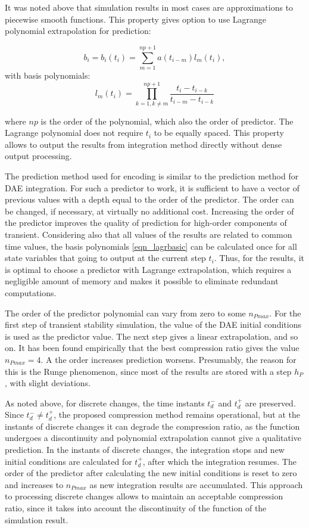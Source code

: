 \documentclass[lettersize,journal]{IEEEtran}
\begin{document}
It was noted above that simulation results  in most cases are approximations to piecewise smooth functions.
This property gives option to use Lagrange polynomial extrapolation for prediction:

\begin{equation}
	\label{eqn_lagrb}
	b_i=b_i(t_i)=\sum_{m=1}^{np+1} a(t_{i-m})l_m(t_i),
\end{equation}
\noindent with basis polynomials:
\begin{equation}
	\label{eqn_lagrbasic}
	l_m(t_i)=\prod_{k=1, k \neq m}^{np+1} \frac{t_i-t_{i-k}}{t_{i-m}-t_{i-k}}
\end{equation}

\noindent where \(np\) is the order of the polynomial, which also the order of predictor. 
The Lagrange polynomial does not require \(t_i\) to be equally spaced. This property allows to output
the results from integration method directly without dense output processing.

The prediction method used for encoding is similar to the prediction method for DAE integration. 
For such a predictor to work, it is sufficient to have a vector of previous values with a depth equal to the order of the predictor. 
The order can be changed, if necessary, at virtually no additional cost. 
Increasing the order of the predictor improves the quality of prediction for high-order components of transient. 
Considering also that all values of the results are related to common time values, the basis polynomials \ref{eqn_lagrbasic} can be calculated once 
for all state variables that going to output at the current step \(t_i\). Thus, for the results, it is optimal 
to choose a predictor with Lagrange extrapolation, which requires a negligible amount of memory and makes it possible to eliminate redundant computations.

The order of the predictor polynomial can vary from zero to some \(n_{Pmax}\). For the first step of transient stability simulation, the value of the DAE
initial conditions is used as the predictor value. The next step gives a linear extrapolation, and so on. 
It has been found empirically that the best compression ratio gives the value \(n_{Pmax}=4\). A the order increases prediction worsens. Presumably, the reason for this is the Runge phenomenon, since most of the results are stored with a step \(h_P\), with slight deviations.

As noted above, for discrete changes, the time instants \(t_d^-\) and \(t_d^+\) are preserved. 
Since \(t_d^- \neq t_d^+\), the proposed compression method  remains operational, but at the instants of 
discrete changes it can degrade the compression ratio, as the function undergoes a discontinuity 
and polynomial extrapolation cannot give a qualitative prediction. In the instants of discrete changes, 
the integration stops and new initial conditions are calculated for \(t_d^+\), 
after which the integration resumes. The order of the predictor after calculating the new initial conditions is reset to zero and increases 
to \(n_{Pmax}\) as new integration results are accumulated. This approach to processing discrete changes allows to maintain an acceptable compression ratio, since it takes into account the discontinuity of the function of the simulation result.
 
\end{document}
